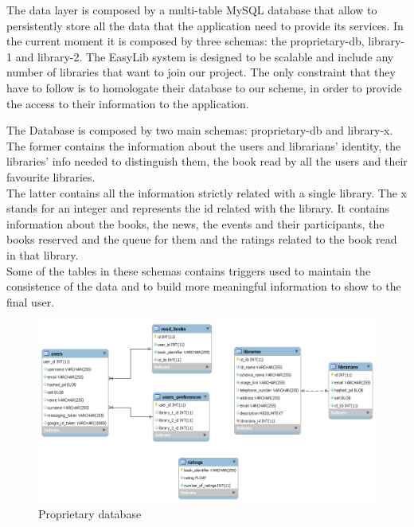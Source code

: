 The data layer is composed by a multi-table MySQL database that allow to persistently store all the data that the application need to provide its services. In the current moment it is composed by three schemas: the proprietary-db, library-1 and library-2. The EasyLib system is designed to be scalable and include any number of libraries that want to join our project. The only constraint that they have to follow is to homologate their database to our scheme, in order to provide the access to their information to the application. 

The Database is composed by two main schemas: proprietary-db and library-x. The former contains the information about the users and librarians’ identity, the libraries’ info needed to distinguish them, the book read by all the users and their favourite libraries.\\
The latter contains all the information strictly related with a single library. The x stands for an integer and represents the id related with the library. It contains information about the books, the news, the events and their participants, the books reserved and the queue for them and the ratings related to the book read in that library.\\
Some of the tables in these schemas contains triggers used to maintain the consistence of the data and to build more meaningful information to show to the final user. 


\vspace*{0cm}
\begin{figure}[H]
	\centering
	\includegraphics[scale=0.50]{Images/Diagrams/proprietary_db_UML}
	\caption{Proprietary database}
\end{figure}

